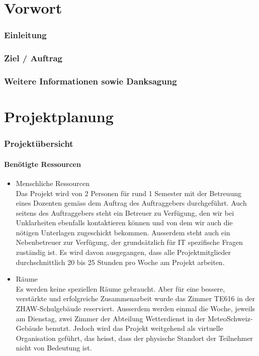 \documentclass[a4paper,10pt]{article}
\begin{document}
\cleardoublepage
\begingroup
\pagestyle{empty}
\setcounter{tocdepth}{2}
\tableofcontents
\clearpage
\endgroup
       
\newpage

\setcounter{page}{1} 
\part{Vorwort}
\section{Einleitung}

\section{Ziel / Auftrag}

\section{Weitere Informationen sowie Danksagung}

\newpage
\part{Projektplanung}

\section{Projektübersicht}

\subsection{Benötigte Ressourcen}
\begin{itemize}
\item Menschliche Ressourcen \\
Das Projekt wird von 2 Personen für rund 1 Semester mit der Betreuung eines Dozenten gemäss dem Auftrag des Auftraggebers durchgeführt. Auch seitens des Auftraggebers steht ein Betreuer zu Verfügung, den wir bei Unklarheiten ebenfalls kontaktieren können und von dem wir auch die nötigen Unterlagen zugeschickt bekommen. Ausserdem steht auch ein Nebenbetreuer zur Verfügung, der grundsätzlich für IT spezifische Fragen zuständig ist. Es wird davon ausgegangen, dass alle Projektmitglieder durchschnittlich 20 bis 25 Stunden pro Woche am Projekt arbeiten.\\
\item Räume \\
Es werden keine speziellen Räume gebraucht. Aber für eine bessere, verstärkte und erfolgreiche Zusammenarbeit wurde das Zimmer TE616 in der ZHAW-Schulgebäude reserviert. Ausserdem werden einmal die Woche, jeweils am Dienstag, zwei Zimmer der Abteilung Wetterdienst in der MeteoSchweiz-Gebäude benutzt. Jedoch wird das Projekt weitgehend als virtuelle Organisation geführt, das heisst, dass der physische Standort der Teilnehmer nicht von Bedeutung ist.

\end{itemize}
\end{document}
